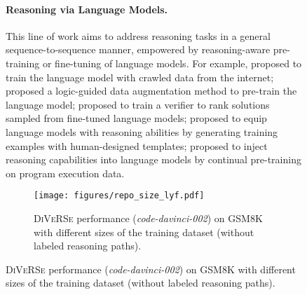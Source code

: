 \documentclass[11pt,a4paper]{article}
\begin{document}
\begin{figure}[t]
\begin{tcolorbox}[colback=blue!5!white,colframe=blue!75!black,title=Chain-Of-Thought Reasoning for GSM8K Math Word Problem,fontupper=\footnotesize,fonttitle=\scriptsize]
\paragraph{Reasoning via Language Models.}
This line of work aims to address reasoning tasks in a general sequence-to-sequence manner, empowered by reasoning-aware pre-training or fine-tuning of language models.
For example, \citet{deng-etal-2021-reasonbert} proposed to train the language model with crawled data from the internet;
\citet{asai-hajishirzi-2020-logic} proposed a logic-guided data augmentation method to pre-train the language model; 
\citet{shen2021generate,cobbe2021training} proposed to train a verifier to rank solutions sampled from fine-tuned language models;
\citet{geva-etal-2020-injecting,yoran-etal-2022-turning,campagna-etal-2020-zero,wang-etal-2022-logic} proposed to equip language models with reasoning abilities by generating training examples with human-designed templates;
\citet{pi2022reasoning} proposed to inject reasoning capabilities into language models by continual pre-training on program execution data.

 \begin{figure}[t]
	\centering
	\texttt{[image: figures/repo\_size\_lyf.pdf]}
	\caption{\textsc{DiVeRSe} performance (\emph{code-davinci-002}) on GSM8K with different sizes of the training dataset (without labeled reasoning paths).}
	\label{fig:number_of_exemplars}
\end{figure}


\end{tcolorbox}
\end{figure}
\end{document}
